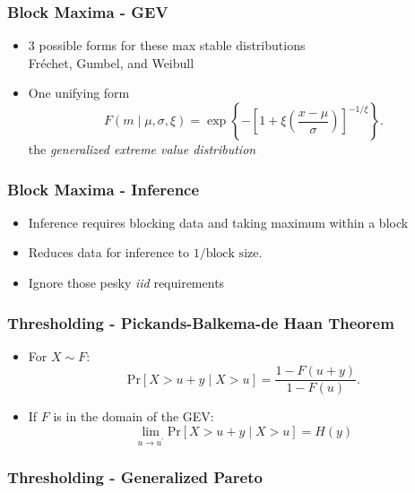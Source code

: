 \documentclass[aspectratio=169]{beamer}
\begin{document}
\begin{frame}
  \frametitle{Block Maxima - GEV}
  \begin{itemize}
    \item 3 possible forms for these max stable distributions\\
      \hspace{1cm}Fr{\'e}chet, Gumbel, and Weibull
    \pause
    \item One unifying form
      \begin{equation*}
        F(m \mid \mu, \sigma, \xi) = \exp\left\lbrace-\left[1 +
              \xi\left(\frac{x - \mu}{\sigma}\right)\right]_{}^{-1/{\xi}}\right\rbrace.
      \end{equation*}
      the \emph{generalized extreme value distribution}
  \end{itemize}
\end{frame}

\begin{frame}
  \frametitle{Block Maxima - Inference}
  \begin{itemize}
    \item Inference requires blocking data and taking maximum within a block
    \pause
    \item Reduces data for inference to $1 / \text{block size}$.
    \pause
    \item Ignore those pesky \emph{iid} requirements
  \end{itemize}
\end{frame}

\begin{frame}
  \frametitle{Thresholding - Pickands-Balkema-de Haan Theorem}
  \begin{itemize}
    \item For $X \sim F$:
      \begin{equation*}
        \text{Pr}\left[X > u + y\mid X > u\right] = \frac{1 - F(u + y)}{1 - F(u)}.
      \end{equation*}
    \pause
    \item If $F$ is in the domain of the GEV:
      \begin{equation*}
        \lim\limits_{u\to u^{\prime}}\text{Pr}\left[X > u + y\mid X > u\right] = H(y)
      \end{equation*}
  \end{itemize}
\end{frame}

\begin{frame}
  \frametitle{Thresholding - Generalized Pareto}

\end{frame}
\end{document}
